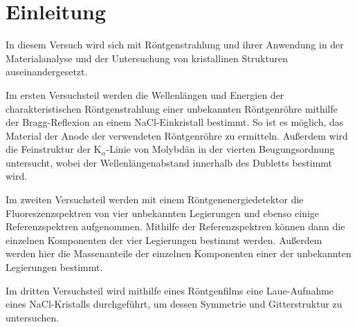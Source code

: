 \section{Einleitung}\label{sec:einleitung}
In diesem Versuch wird sich mit Röntgenstrahlung und ihrer Anwendung in der Materialanalyse und der Untersuchung von kristallinen Strukturen auseinandergesetzt.\par
Im ersten Versuchsteil werden die Wellenlängen und Energien der charakteristischen Röntgenstrahlung einer unbekannten Röntgenröhre mithilfe der Bragg-Reflexion
an einem NaCl-Einkristall bestimmt. So ist es möglich, das Material der Anode der verwendeten Röntgenröhre zu ermitteln. Außerdem wird die Feinstruktur
der $\mathrm{K}_{\alpha}$-Linie von Molybdän in der vierten Beugungsordnung untersucht, wobei der Wellenlängenabstand innerhalb des Dubletts bestimmt wird.\par
Im zweiten Versuchsteil werden mit einem Röntgenenergiedetektor die Fluoreszenzspektren von vier unbekannten Legierungen und ebenso einige Referenzspektren
aufgenommen. Mithilfe der Referenzspektren können dann die einzelnen Komponenten der vier Legierungen bestimmt werden. Außerdem werden hier
die Massenanteile der einzelnen Komponenten einer der unbekannten Legierungen bestimmt.\par
Im dritten Versuchsteil wird mithilfe eines Röntgenfilms eine Laue-Aufnahme eines NaCl-Kristalls durchgeführt, um dessen Symmetrie und Gitterstruktur zu untersuchen.